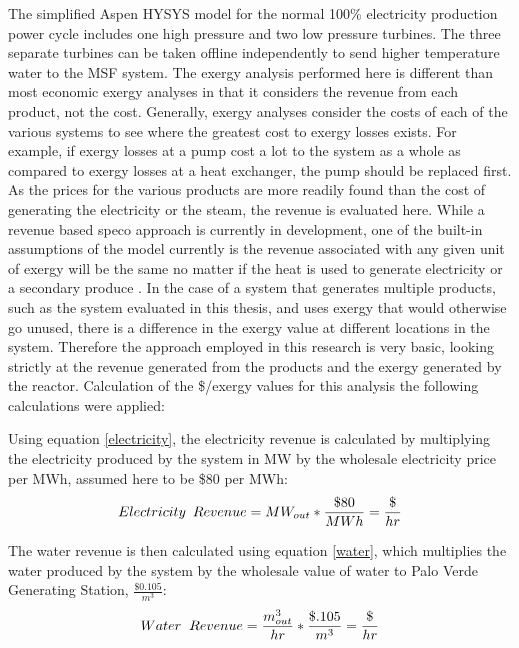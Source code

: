 The simplified Aspen HYSYS model for the normal 100\% electricity production power cycle includes one high pressure and two low pressure turbines.  The three separate turbines can be taken offline independently to send higher temperature water to the MSF system. The exergy analysis performed here is different than most economic exergy analyses in that it considers the revenue from each product, not the cost. Generally, exergy analyses consider the costs of each of the various systems to see where the greatest cost to exergy losses exists. For example, if exergy losses at a pump cost a lot to the system as a whole as compared to exergy losses at a heat exchanger, the pump should be replaced first.  As the prices for the various products are more readily found than the cost of generating the electricity or the steam, the revenue is evaluated here.  While a revenue based \ac{speco} approach is currently in development, one of the built-in assumptions of the model currently is the revenue associated with any given unit of exergy will be the same no matter if the heat is used to generate electricity or a secondary produce \cite{Paulus2006}.  In the case of a system that generates multiple products, such as the system evaluated in this thesis, and uses exergy that would otherwise go unused, there is a difference in the exergy value at different locations in the system. Therefore the approach employed in this research is very basic, looking strictly at the revenue generated from the products and the exergy generated by the reactor. Calculation of the \$/exergy values for this analysis the following calculations were applied:

Using equation \ref{electricity}, the electricity revenue is calculated by multiplying the electricity produced by the system in MW by the wholesale electricity price per MWh, assumed here to be \$80 per MWh:
\begin{equation}
Electricity\hspace{.175cm} Revenue=MW_{out}*\frac{\$80}{MWh}=\frac{\$}{hr}
\label{electricity}
\end{equation}

The water revenue is then calculated using equation \ref{water}, which multiplies the water produced by the system by the wholesale value of water to Palo Verde Generating Station, $\frac{\$0.105}{m^3}$:
\begin{equation}
Water\hspace{.2cm} Revenue=\frac{m^3_{out}}{hr}*\frac{\$.105}{m^3}=\frac{\$}{hr}
\label{water}
\end{equation}


